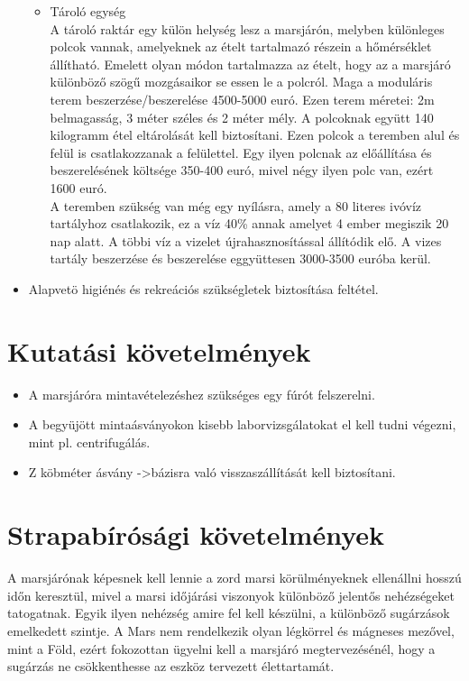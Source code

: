 \documentclass[12pt]{report}
\begin{document}
\begin{itemize}
\begin{itemize}
    \item Tároló egység \\
    A tároló raktár egy külön helység lesz a marsjárón, melyben különleges polcok vannak, amelyeknek az ételt tartalmazó részein a hőmérséklet állítható. Emelett olyan módon tartalmazza az ételt, hogy az a marsjáró különböző szögű mozgásaikor se essen le a polcról. Maga a moduláris terem beszerzése/beszerelése 4500-5000 euró. Ezen terem méretei: 2m belmagasság, 3 méter széles és 2 méter mély. A polcoknak együtt 140 kilogramm étel eltárolását kell biztosítani. Ezen polcok a teremben alul és felül is csatlakozzanak a felülettel. Egy ilyen polcnak az előállítása és beszerelésének költsége 350-400 euró, mivel négy ilyen polc van, ezért 1600 euró. \\
    A teremben szükség van még egy nyílásra, amely a 80 literes ivóvíz tartályhoz csatlakozik, ez a víz 40\% annak amelyet 4 ember megiszik 20 nap alatt. A többi víz a vizelet újrahasznosítással állítódik elő. A vizes tartály beszerzése és beszerelése eggyüttesen 3000-3500 euróba kerül.  
  \end{itemize}  
  \item Alapvetö higiénés és rekreációs szükségletek biztosítása feltétel.
\end{itemize}
\section{Kutatási követelmények}
\begin{itemize}
  \item A marsjáróra mintavételezéshez szükséges egy fúrót felszerelni.
  \item A begyüjött mintaásványokon kisebb laborvizsgálatokat el kell tudni végezni, mint pl. centrifugálás.
  \item Z köbméter ásvány ->bázisra való visszaszállítását kell biztosítani.
\end{itemize}

\section{Strapabírósági követelmények}
A marsjárónak képesnek kell lennie a zord marsi körülményeknek ellenállni hosszú időn keresztül, mivel a marsi időjárási viszonyok különböző jelentős nehézségeket tatogatnak. Egyik ilyen nehézség amire fel kell készülni, a különböző sugárzások emelkedett szintje. A Mars nem rendelkezik olyan légkörrel és 
mágneses mezővel, mint a Föld, ezért fokozottan ügyelni kell a marsjáró megtervezésénél, hogy a sugárzás ne csökkenthesse az eszköz tervezett élettartamát. 
\end{document}
